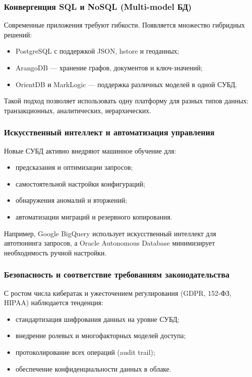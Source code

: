 \subsubsection{Конвергенция SQL и NoSQL (Multi-model БД)}

Современные приложения требуют гибкости. Появляется множество гибридных решений:
\begin{itemize}
	\item PostgreSQL с поддержкой JSON, hstore и геоданных;
	\item ArangoDB — хранение графов, документов и ключ-значений;
	\item OrientDB и MarkLogic — поддержка различных моделей в одной СУБД.
\end{itemize}

Такой подход позволяет использовать одну платформу для разных типов данных: транзакционных, аналитических, иерархических.

\subsubsection{Искусственный интеллект и автоматизация управления}

Новые СУБД активно внедряют машинное обучение для:
\begin{itemize}
	\item предсказания и оптимизации запросов;
	\item самостоятельной настройки конфигураций;
	\item обнаружения аномалий и вторжений;
	\item автоматизации миграций и резервного копирования.
\end{itemize}

Например, Google BigQuery использует искусственный интеллект для автотюнинга запросов, а Oracle Autonomous Database минимизирует необходимость ручной настройки.

\subsubsection{Безопасность и соответствие требованиям законодательства}

С ростом числа кибератак и ужесточением регулирования (GDPR, 152-ФЗ, HIPAA) наблюдается тенденция:
\begin{itemize}
	\item стандартизация шифрования данных на уровне СУБД;
	\item внедрение ролевых и многофакторных моделей доступа;
	\item протоколирование всех операций (audit trail);
	\item обеспечение конфиденциальности данных в облаке.
\end{itemize}

